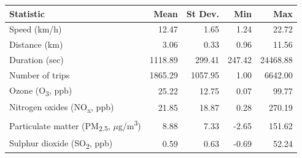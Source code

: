 \begin{tabular}{lrrrr}
\toprule
Statistic & Mean & St Dev. & Min & Max \\
\midrule
Speed (km/h) & 12.47 & 1.65 & 1.24 & 22.72 \\
Distance (km) & 3.06 & 0.33 & 0.96 & 11.56 \\
Duration (sec) & 1118.89 & 299.41 & 247.42 & 24468.88 \\
Number of trips & 1865.29 & 1057.95 & 1.00 & 6642.00 \\
Ozone (O\textsubscript{3}, ppb) & 25.22 & 12.75 & 0.07 & 99.77 \\
Nitrogen oxides (NO\textsubscript{x}, ppb) & 21.85 & 18.87 & 0.28 & 270.19 \\
Particulate matter (PM\textsubscript{2.5}, $\mu$g/m\textsuperscript{3}) & 8.88 & 7.33 & -2.65 & 151.62 \\
Sulphur dioxide (SO\textsubscript{2}, ppb) & 0.59 & 0.63 & -0.69 & 52.24 \\
\bottomrule
\end{tabular}
